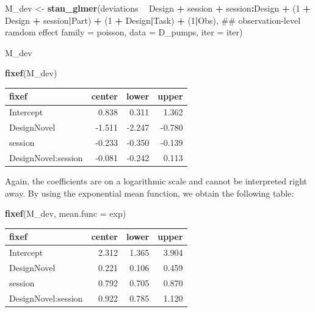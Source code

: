 \documentclass[]{svmono}
\newenvironment{Shaded}{\begin{snugshade}}{\end{snugshade}}
\newcommand{\KeywordTok}[1]{\textcolor[rgb]{0.13,0.29,0.53}{\textbf{#1}}}
\newcommand{\DataTypeTok}[1]{\textcolor[rgb]{0.13,0.29,0.53}{#1}}
\newcommand{\DecValTok}[1]{\textcolor[rgb]{0.00,0.00,0.81}{#1}}
\newcommand{\StringTok}[1]{\textcolor[rgb]{0.31,0.60,0.02}{#1}}
\newcommand{\OperatorTok}[1]{\textcolor[rgb]{0.81,0.36,0.00}{\textbf{#1}}}
\newcommand{\NormalTok}[1]{#1}
\theoremstyle{definition}
\theoremstyle{definition}
\theoremstyle{definition}
\theoremstyle{remark}
\begin{document}
\begin{Shaded}
\begin{Highlighting}[]
\NormalTok{M_dev <-}\StringTok{ }
\StringTok{  }\KeywordTok{stan_glmer}\NormalTok{(deviations }\OperatorTok{~}\StringTok{ }\NormalTok{Design }\OperatorTok{+}\StringTok{ }\NormalTok{session }\OperatorTok{+}\StringTok{ }\NormalTok{session}\OperatorTok{:}\NormalTok{Design }\OperatorTok{+}\StringTok{ }
\StringTok{               }\NormalTok{(}\DecValTok{1} \OperatorTok{+}\StringTok{ }\NormalTok{Design }\OperatorTok{+}\StringTok{ }\NormalTok{session}\OperatorTok{|}\NormalTok{Part) }\OperatorTok{+}
\StringTok{               }\NormalTok{(}\DecValTok{1} \OperatorTok{+}\StringTok{ }\NormalTok{Design}\OperatorTok{|}\NormalTok{Task) }\OperatorTok{+}
\StringTok{               }\NormalTok{(}\DecValTok{1}\OperatorTok{|}\NormalTok{Obs), ## observation-level ramdom effect}
             \DataTypeTok{family =}\NormalTok{ poisson,}
             \DataTypeTok{data =}\NormalTok{ D_pumps, }\DataTypeTok{iter =}\NormalTok{ iter) }

\NormalTok{M_dev}
\end{Highlighting}
\end{Shaded}

\begin{Shaded}
\begin{Highlighting}[]
\KeywordTok{fixef}\NormalTok{(M_dev)}
\end{Highlighting}
\end{Shaded}

\begin{longtable}[]{@{}lrrr@{}}
\toprule
fixef & center & lower & upper\tabularnewline
\midrule
\endhead
Intercept & 0.838 & 0.311 & 1.362\tabularnewline
DesignNovel & -1.511 & -2.247 & -0.780\tabularnewline
session & -0.233 & -0.350 & -0.139\tabularnewline
DesignNovel:session & -0.081 & -0.242 & 0.113\tabularnewline
\bottomrule
\end{longtable}

Again, the coefficients are on a logarithmic scale and cannot be
interpreted right away. By using the exponential mean function, we
obtain the following table:

\begin{Shaded}
\begin{Highlighting}[]
\KeywordTok{fixef}\NormalTok{(M_dev, }\DataTypeTok{mean.func =}\NormalTok{ exp)}
\end{Highlighting}
\end{Shaded}

\begin{longtable}[]{@{}lrrr@{}}
\toprule
fixef & center & lower & upper\tabularnewline
\midrule
\endhead
Intercept & 2.312 & 1.365 & 3.904\tabularnewline
DesignNovel & 0.221 & 0.106 & 0.459\tabularnewline
session & 0.792 & 0.705 & 0.870\tabularnewline
DesignNovel:session & 0.922 & 0.785 & 1.120\tabularnewline
\bottomrule
\end{longtable}
\end{document}
